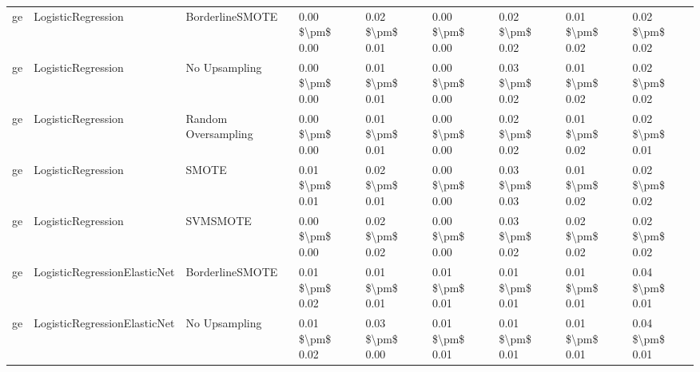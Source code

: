 \begin{tabular}{lllllllll}
      ge &              LogisticRegression &               BorderlineSMOTE & 0.00 \$\textbackslash pm\$ 0.00 &           0.02 \$\textbackslash pm\$ 0.01 &       0.00 \$\textbackslash pm\$ 0.00 &        0.02 \$\textbackslash pm\$ 0.02 &                         0.01 \$\textbackslash pm\$ 0.02 &     0.02 \$\textbackslash pm\$ 0.02 \\
      ge &              LogisticRegression &                 No Upsampling & 0.00 \$\textbackslash pm\$ 0.00 &           0.01 \$\textbackslash pm\$ 0.01 &       0.00 \$\textbackslash pm\$ 0.00 &        0.03 \$\textbackslash pm\$ 0.02 &                         0.01 \$\textbackslash pm\$ 0.02 &     0.02 \$\textbackslash pm\$ 0.02 \\
      ge &              LogisticRegression &           Random Oversampling & 0.00 \$\textbackslash pm\$ 0.00 &           0.01 \$\textbackslash pm\$ 0.01 &       0.00 \$\textbackslash pm\$ 0.00 &        0.02 \$\textbackslash pm\$ 0.02 &                         0.01 \$\textbackslash pm\$ 0.02 &     0.02 \$\textbackslash pm\$ 0.01 \\
      ge &              LogisticRegression &                         SMOTE & 0.01 \$\textbackslash pm\$ 0.01 &           0.02 \$\textbackslash pm\$ 0.01 &       0.00 \$\textbackslash pm\$ 0.00 &        0.03 \$\textbackslash pm\$ 0.03 &                         0.01 \$\textbackslash pm\$ 0.02 &     0.02 \$\textbackslash pm\$ 0.02 \\
      ge &              LogisticRegression &                      SVMSMOTE & 0.00 \$\textbackslash pm\$ 0.00 &           0.02 \$\textbackslash pm\$ 0.02 &       0.00 \$\textbackslash pm\$ 0.00 &        0.03 \$\textbackslash pm\$ 0.02 &                         0.02 \$\textbackslash pm\$ 0.02 &     0.02 \$\textbackslash pm\$ 0.02 \\
      ge &    LogisticRegressionElasticNet &               BorderlineSMOTE & 0.01 \$\textbackslash pm\$ 0.02 &           0.01 \$\textbackslash pm\$ 0.01 &       0.01 \$\textbackslash pm\$ 0.01 &        0.01 \$\textbackslash pm\$ 0.01 &                         0.01 \$\textbackslash pm\$ 0.01 &     0.04 \$\textbackslash pm\$ 0.01 \\
      ge &    LogisticRegressionElasticNet &                 No Upsampling & 0.01 \$\textbackslash pm\$ 0.02 &           0.03 \$\textbackslash pm\$ 0.00 &       0.01 \$\textbackslash pm\$ 0.01 &        0.01 \$\textbackslash pm\$ 0.01 &                         0.01 \$\textbackslash pm\$ 0.01 &     0.04 \$\textbackslash pm\$ 0.01 \\

\end{tabular}
